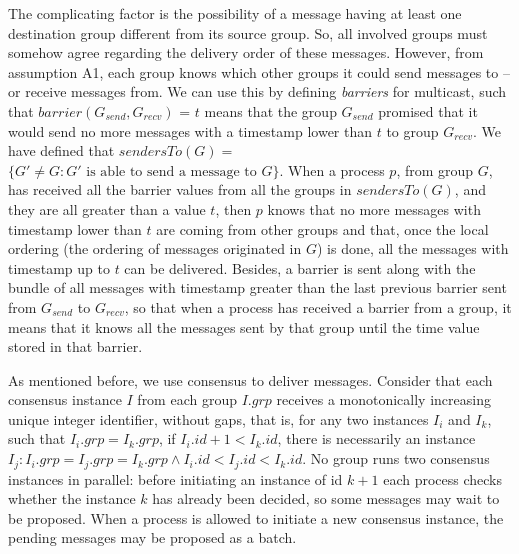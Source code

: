 \documentclass[times, 10pt]{article}
\begin{document}
The complicating factor is the possibility of a message having at least one destination group different from its source group. So, all involved groups must somehow agree regarding the delivery order of these messages. However, from assumption A1, each group knows which other groups it could send messages to -- or receive messages from. We can use this by defining \emph{barriers} for multicast, such that $barrier(G_{send},G_{recv})$ = $t$ means that the group $G_{send}$ promised that it would send no more messages with a timestamp lower than $t$ to group $G_{recv}$. We have defined that $sendersTo(G) =$ \mbox{$\{G' \neq G : G'\text{ is able to send a message to }G\}$}. When a process $p$, from group $G$, has received all the barrier values from all the groups in $sendersTo(G)$, and they are all greater than a value $t$, then $p$ knows that no more messages with timestamp lower than $t$ are coming from other groups and that, once the local ordering (the ordering of messages originated in $G$) is done, all the messages with timestamp up to $t$ can be delivered. Besides, a barrier is sent along with the bundle of all messages with timestamp greater than the last previous barrier sent from $G_{send}$ to $G_{recv}$, so that when a process has received a barrier from a group, it means that it knows all the messages sent by that group until the time value stored in that barrier.

As mentioned before, we use consensus to deliver messages. Consider that each consensus instance $I$ from each group $I.grp$ receives a monotonically increasing unique integer identifier, without gaps, that is, for any two instances $I_i$ and $I_k$, such that $I_i.grp = I_k.grp$, if $I_i.id + 1 < I_k.id$, there is necessarily an instance $I_j : I_i.grp = I_j.grp = I_k.grp \wedge I_i.id < I_j.id < I_k.id$. No group runs two consensus instances in parallel: before initiating an instance of id $k+1$ each process checks whether the instance $k$ has already been decided, so some messages may wait to be proposed. When a process is allowed to initiate a new consensus instance, the pending messages may be proposed as a batch.%
\end{document}
